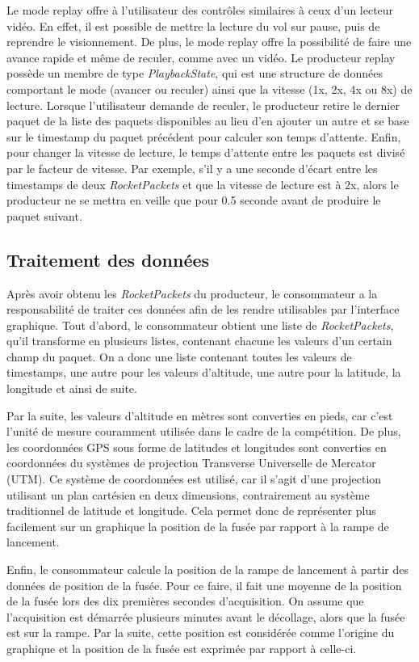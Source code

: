 Le mode replay offre à l'utilisateur des contrôles similaires à ceux d'un lecteur vidéo.
En effet, il est possible de mettre la lecture du vol sur pause, puis de reprendre le visionnement.
De plus, le mode replay offre la possibilité de faire une avance rapide et même de reculer, comme avec un vidéo.
Le producteur replay possède un membre de type \emph{PlaybackState}, qui est une structure de données comportant le mode (avancer ou reculer) ainsi que la vitesse (1x, 2x, 4x ou 8x) de lecture.
Lorsque l'utilisateur demande de reculer, le producteur retire le dernier paquet de la liste des paquets disponibles au lieu d'en ajouter un autre et se base sur le timestamp du paquet précédent pour calculer son temps d'attente.
Enfin, pour changer la vitesse de lecture, le temps d'attente entre les paquets est divisé par le facteur de vitesse.
Par exemple, s'il y a une seconde d'écart entre les timestamps de deux \emph{RocketPackets} et que la vitesse de lecture est à 2x, alors le producteur ne se mettra en veille que pour 0.5 seconde avant de produire le paquet suivant.

\subsection{Traitement des données}
\label{s:traitement}
Après avoir obtenu les \emph{RocketPackets} du producteur, le consommateur a la responsabilité de traiter ces données afin de les rendre utilisables par l'interface graphique.
Tout d'abord, le consommateur obtient une liste de \emph{RocketPackets}, qu'il transforme en plusieurs listes, contenant chacune les valeurs d'un certain champ du paquet.
On a donc une liste contenant toutes les valeurs de timestamps, une autre pour les valeurs d'altitude, une autre pour la latitude, la longitude et ainsi de suite.

Par la suite, les valeurs d'altitude en mètres sont converties en pieds, car c'est l'unité de mesure couramment utilisée dans le cadre de la compétition.
De plus, les coordonnées GPS sous forme de latitudes et longitudes sont converties en coordonnées du systèmes de projection Transverse Universelle de Mercator (UTM).
Ce système de coordonnées est utilisé, car il s'agit d'une projection utilisant un plan cartésien en deux dimensions, contrairement au système traditionnel de latitude et longitude.
Cela permet donc de représenter plus facilement sur un graphique la position de la fusée par rapport à la rampe de lancement.

Enfin, le consommateur calcule la position de la rampe de lancement à partir  des données de position de la fusée.
Pour ce faire, il fait une moyenne de la position de la fusée lors des dix premières secondes d'acquisition.
On assume que l'acquisition est démarrée plusieurs minutes avant le décollage, alors que la fusée est sur la rampe.
Par la suite, cette position est considérée comme l'origine du graphique et la position de la fusée est exprimée par rapport à celle-ci.

